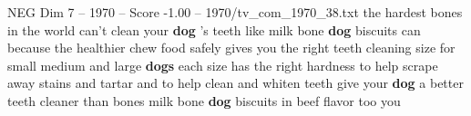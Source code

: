 \begin{textsample}{NEG Dim 7 – 1970 – Score -1.00 – 1970/tv\_com\_1970\_38.txt}  \label{ex:f7_neg_061}
the hardest bones in the world can't clean your \textbf{dog} 's teeth like milk bone \textbf{dog} biscuits can because the healthier chew food safely gives you the right teeth cleaning size for small medium and large \textbf{dogs} each size has the right hardness to help scrape away stains and tartar and to help clean and whiten teeth give your \textbf{dog} a better teeth cleaner than bones milk bone \textbf{dog} biscuits in beef flavor too you

\end{textsample}
